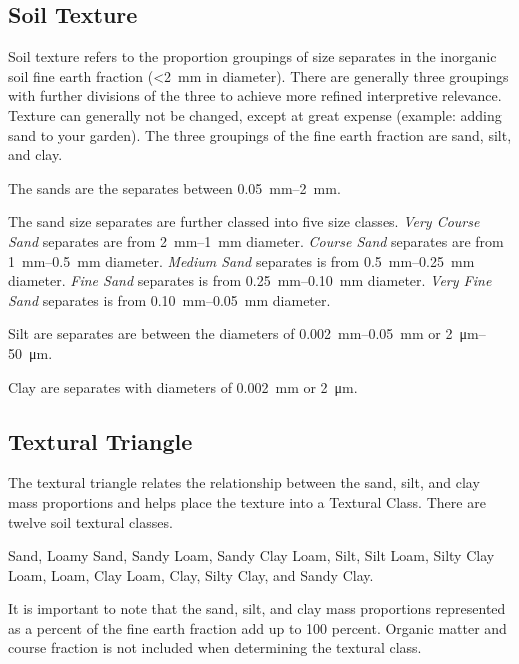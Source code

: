 \documentclass[a5paper]{report}
\begin{document}
\subsection{Soil Texture}
    
Soil texture refers to the proportion groupings of size separates in the inorganic soil fine earth fraction (\textless \qty[mode = text]{2}{\milli\metre} in diameter). There are generally three groupings with further divisions of the three to achieve more refined interpretive relevance. Texture can generally not be changed, except at great expense (example: adding sand to your garden). The three groupings of the fine earth fraction are sand, silt, and clay.
    
The sands are the separates between \qtyrange{0.05}{2}{\milli\metre}.

The sand size separates are further classed into five size classes. \emph{Very Course Sand} separates are from \qtyrange{2}{1}{\milli\metre} diameter. \emph{Course Sand} separates are from \qtyrange{1}{0.5}{\milli\metre} diameter. \emph{Medium Sand} separates is from \qtyrange{0.5}{0.25}{\milli\metre} diameter. \emph{Fine Sand} separates is from \qtyrange{0.25}{0.10}{\milli\metre} diameter. \emph{Very Fine Sand} separates is from \qtyrange{0.10}{0.05}{\milli\metre} diameter.
    
Silt are separates are between the diameters of \qtyrange{0.002}{0.05}{\milli\metre} or \qtyrange{2}{50}{\micro\metre}.

Clay are separates with diameters of \qty[mode = text]{0.002}{\milli\metre} or \qty[mode = text]{2}{\micro\metre}.

\subsection{Textural Triangle}
    
The textural triangle relates the relationship between the sand, silt, and clay mass proportions and helps place the texture into a Textural Class. There are twelve soil textural classes.
    
Sand, Loamy Sand, Sandy Loam, Sandy Clay Loam, Silt, Silt Loam, Silty Clay Loam, Loam, Clay Loam, Clay, Silty Clay, and Sandy Clay.
    
It is important to note that the sand, silt, and clay mass proportions represented as a percent of the fine earth fraction add up to 100 percent. Organic matter and course fraction is not included when determining the textural class.
    
\end{document}
